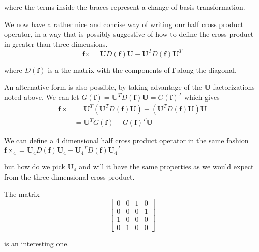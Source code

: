 \documentclass{article}      %
\newcommand{\Bf}[0]{\mathbf{f}}
\newcommand{\BU}[0]{\mathbf{U}}
\newcommand{\cross}[0]{\times}
\begin{document}
where the terms inside the braces represent a change of basis transformation.

We now have a rather nice and concise way of writing our half cross product operator, in a way
that is possibly suggestive of how to define the cross product in greater than three dimensions.
\begin{equation*}
\Bf \cross = \BU D(\Bf) \BU - \BU^T D(\Bf) \BU^T
\end{equation*}

where $D(\Bf)$ is a the matrix with the components of $\Bf$ along the diagonal.

An alternative form is also possible, by taking advantage of the $\BU$ factorizations noted above.
We can let $G(\Bf) = \BU^T D(\Bf) \BU = G(\Bf)^T$ which gives
\begin{align*}
\Bf \cross &= \BU^T (\BU^T D(\Bf) \BU) - (\BU^T D(\Bf) \BU) \BU \\
           &= \BU^T G(\Bf) - G(\Bf)^T \BU
\end{align*}

We can define a 4 dimensional half cross product operator in the same 
fashion
$
\Bf \cross_4 = \BU_4 D(\Bf) \BU_4 - {\BU_4}^T D(\Bf) {\BU_4}^T
$

but how do we pick $\BU_4$ and will it have the same properties as we 
would expect from the three dimensional cross product.

The matrix
\begin{equation*}
\begin{bmatrix}
0 & 0 & 1 & 0 \\
0 & 0 & 0 & 1 \\
1 & 0 & 0 & 0 \\
0 & 1 & 0 & 0
\end{bmatrix}
\end{equation*}

is an interesting one.
\end{document}
